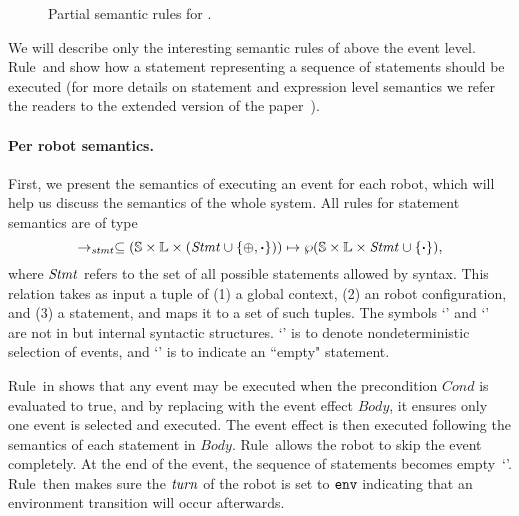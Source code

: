 \begin{figure}
\begin{mathpar}
%
\end{mathpar}
\caption{Partial semantic rules for \lgname.}\label{fig:partial-semantics}
\end{figure}

%
We will describe only the interesting semantic rules of \lgname  above the event level.
Rule~\StmtSeqRuleOne and \StmtSeqRuleTwo show how a statement representing a sequence of statements should be executed (for more details on statement and expression level semantics we refer the readers to the extended version of the paper~\cite{}).
%

\paragraph{Per robot semantics.}
First, we present the semantics of executing an event for each robot,
which will help us discuss the semantics of the whole system.
All rules for statement semantics are of type
\[
\stmtrule \subseteq (\pws \times \pwl\times (\pwstmt \cup \{\SelectEvent, \EndEvent\})) \mapsto \wp(\pws\times \pwl \times \pwstmt\cup \{\EndEvent\}),
\]
where $\pwstmt$ refers to the set of all possible statements allowed by \lgname syntax.
This relation takes as input a tuple of (1) a global context, (2) an robot configuration, and (3) a statement,
and maps it to a set of such tuples.
The symbols `\SelectEvent' and `\EndEvent' are not in \lgname but internal syntactic structures.
`\SelectEvent' is to denote nondeterministic selection of events,
and `\EndEvent' is to indicate an ``empty" statement.

Rule~\SelectEventRule in  shows that any event may be executed when the precondition $Cond$ is evaluated to true,
and by replacing \SelectEvent with the event effect $\mathit{Body}$, it ensures only one event is selected and executed.
The event effect is then executed following the semantics of each statement in $\mathit{Body}$.
Rule~\SkipEventRule allows the robot to skip the event completely.
At the end of the event, the sequence of statements becomes empty~`\EndEvent'.
Rule~\EndEventRule then makes sure the $\turn$ of the robot is set to $\env$ indicating that
an environment transition will occur afterwards.

